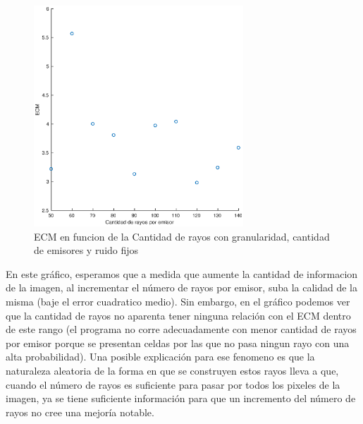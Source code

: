 \begin{figure}[H]
	\centering	\includegraphics[width=0.7\textwidth]{img/cantrayos_ecm}
	\caption{ECM en funcion de la Cantidad de rayos con granularidad, cantidad de emisores y ruido fijos}
	\label{fig:cantrayos_eps}
\end{figure}

En este gráfico, esperamos que a medida que aumente la cantidad de informacion de la imagen, al incrementar el número de rayos por emisor, suba la calidad de la misma (baje el error cuadratico medio).  Sin embargo, en el gráfico podemos ver que la cantidad de rayos no aparenta tener ninguna relación con el ECM dentro de este rango (el programa no corre adecuadamente con menor cantidad de rayos por emisor porque se presentan celdas por las que no pasa ningun rayo con una alta probabilidad). Una posible explicación para ese fenomeno es  que la naturaleza aleatoria de la forma en que se construyen estos rayos lleva a que, cuando el número de rayos es suficiente para pasar por todos los pixeles de la imagen, ya se tiene suficiente información para que un incremento del número de rayos no cree una mejoría notable.

